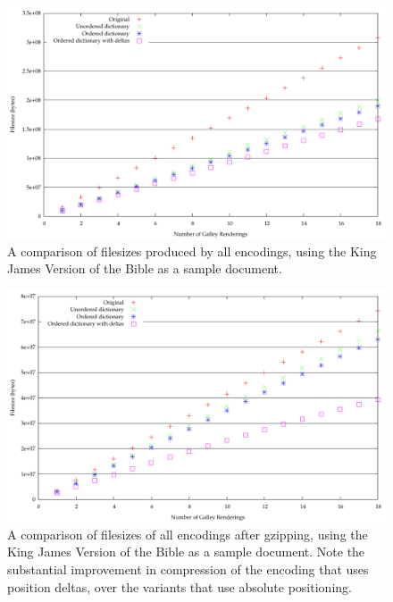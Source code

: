 \begin{figure}
  \begin{center}
  \includegraphics[height=0.5\textheight]{gnuplot/kjv-b}
  \end{center}
  \caption[Comparison of filesizes from all encodings]{A comparison of filesizes produced by all encodings, using the King James Version of the Bible as a sample document.}
  \label{fig:size-all-b}
\end{figure}

\begin{figure}
  \begin{center}
  \includegraphics[height=0.5\textheight]{gnuplot/kjv-gz}
  \end{center}
  \caption[Comparison of gzips of all encodings]{A comparison of filesizes of all encodings after gzipping, using the King James Version of the Bible as a sample document. Note the substantial improvement in compression of the encoding that uses position deltas, over the variants that use absolute positioning.}
  \label{fig:size-all-gz}
\end{figure}


